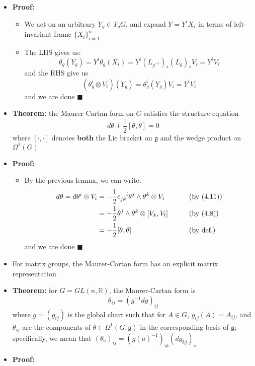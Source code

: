 \documentclass[12pt,a4paper]{article}
\numberwithin{equation}{section}
\begin{document}
\begin{itemize}
		\item \textbf{Proof:}
		\begin{itemize}
			\item We act on an arbitrary $Y_{g}\in T_{g}G$, and expand $Y=Y^{i}X_{i}$ in terms of left-invariant frame $\{X_{i}\}_{i=1}^{n}$
			\item The LHS gives us:
			$$
			\theta_{g}(Y_{g})=Y^{i}\theta_{g}(X_{i})=Y^{i}(L_{g^{-1}})_{*}(L_{g})_{*}V_{i}=Y^{i}V_{i}
			$$
			and the RHS give us
			$$
			(\theta_{g}^{i}\otimes V_{i})(Y_{g})=\theta_{g}^{i}(Y_{g})V_{i}=Y^{i}V_{i}
			$$
			and we are done $\blacksquare$
		\end{itemize}
		\item \textbf{Theorem:} the Maurer-Cartan form on $G$ satisfies the structure equation
		\begin{equation}
			d\theta+\frac{1}{2}[\theta,\theta]=0
		\end{equation}
		where $[\cdot,\cdot]$ denotes \textbf{both} the Lie bracket on $\mathfrak{g}$ and the wedge product on $\Omega^{1}(G)$
		\item \textbf{Proof:}
		\begin{itemize}
			\item By the previous lemma, we can write:
			$$
			\begin{aligned}
				d\theta=d\theta^{i}\otimes V_{i}&=-\frac{1}{2}c\indices{_j_k^i}\theta^{j}\wedge \theta^{k}\otimes V_{i}&\qquad&\text{(by (4.11))}\\
				&=-\frac{1}{2}\theta^{j}\wedge\theta^{k}\otimes [V_{k},V_{l}]&\qquad&\text{(by (4.8))}\\
				&=-\frac{1}{2}[\theta,\theta]&\qquad&\text{(by def.)}
			\end{aligned}
			$$
			and we are done $\blacksquare$
		\end{itemize}
		\item For matrix groups, the Maurer-Cartan form has an explicit matrix representation
		\item \textbf{Theorem:} for $G=GL(n,\mathbb{R})$, the Maurer-Cartan form is
		\begin{equation}
			\theta_{ij}=(g^{-1}dg)_{ij}
		\end{equation}
		where $g=(g_{ij})$ is the global chart such that for $A \in G$, $g_{ij}(A)=A_{ij}$, and $\theta_{ij}$ are the components of $\theta\in\Omega^{1}(G,\mathfrak{g})$ in the corresponding basis of $\mathfrak{g}$; specifically, we mean that $(\theta_{a})_{ij}=(g(a)^{-1})_{ik}(dg_{kj})_{a}$
		\item \textbf{Proof:}

\end{itemize}
\end{document}

